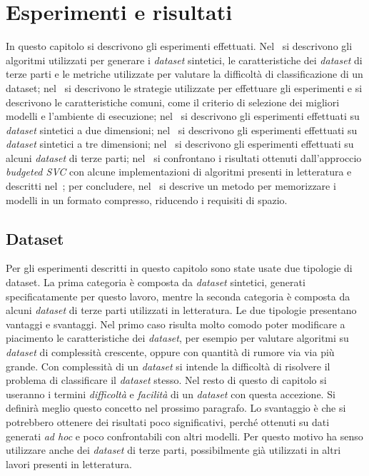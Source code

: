 \chapter{Esperimenti e risultati}
\label{chap:esperimenti}
In questo capitolo si descrivono gli esperimenti effettuati.
Nel~ si descrivono gli algoritmi utilizzati per generare i \emph{dataset} sintetici, le caratteristiche dei \emph{dataset} di terze parti e le metriche utilizzate per valutare la difficoltà di classificazione di un dataset;
nel~ si descrivono le strategie utilizzate per effettuare gli esperimenti e si descrivono le caratteristiche comuni, come il criterio di selezione dei migliori modelli e l'ambiente di esecuzione;
nel~ si descrivono gli esperimenti effettuati su \emph{dataset} sintetici a due dimensioni;
nel~ si descrivono gli esperimenti effettuati su \emph{dataset} sintetici a tre dimensioni;
nel~ si descrivono gli esperimenti effettuati su alcuni \emph{dataset} di terze parti;
nel~ si confrontano i risultati ottenuti dall'approccio \emph{budgeted SVC} con alcune implementazioni di algoritmi presenti in letteratura e descritti nel~; per concludere, nel~ si descrive un metodo per memorizzare i modelli in un formato compresso, riducendo i requisiti di spazio. 

\section{Dataset}\label{sec:exp:dataset}
Per gli esperimenti descritti in questo capitolo sono state usate due tipologie di dataset. 
La prima categoria è composta da \emph{dataset} sintetici, generati specificatamente per questo lavoro, mentre la seconda categoria è composta da alcuni \emph{dataset} di terze parti utilizzati in letteratura. 
Le due tipologie presentano vantaggi e svantaggi. Nel primo caso risulta molto comodo poter modificare a piacimento le caratteristiche dei \emph{dataset}, per esempio per valutare algoritmi su \emph{dataset} di complessità crescente, oppure con quantità di rumore via via più grande.
Con complessità di un \emph{dataset} si intende la difficoltà di risolvere il problema di classificare il \emph{dataset} stesso. Nel resto di questo di capitolo si useranno i termini \emph{difficoltà} e \emph{facilità} di un \emph{dataset} con questa accezione.
Si definirà meglio questo concetto nel prossimo paragrafo.
Lo svantaggio è che si potrebbero ottenere dei risultati poco significativi, perché ottenuti su dati generati \emph{ad hoc} e poco confrontabili con altri modelli. 
Per questo motivo ha senso utilizzare anche dei \emph{dataset} di terze parti, possibilmente già utilizzati in altri lavori presenti in letteratura.

